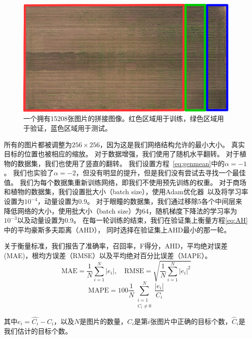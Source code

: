 \documentclass[10pt,twocolumn,letterpaper,UTF8]{article}
\begin{document}
\begin{figure}[t]
\begin{center}
   \includegraphics[width=0.7\linewidth]{fig/field/split.png}
\end{center}
   \caption{
            一个拥有15208张图片的拼接图像。红色区域用于训练，绿色区域用于验证，蓝色区域用于测试。}
\label{fig:ortho}
\end{figure}

所有的图片都被调整为$256 \times 256$，因为这是我们网络结构允许的最小大小。
真实目标的位置也被相应的缩放。
对于数据增强，我们使用了随机水平翻转。
对于植物的数据集，我们也使用了竖直的翻转。
我们设置方程~\eqref{eq:genmean}中的$\alpha=-1$。
我们也实验了$\alpha=-2$，但没有明显的提升，但是我们没有尝试去寻找一个最佳值。
我们为每个数据集重新训练网络，即我们不使用预先训练的权重。
对于商场和植物的数据集，我们设置批大小（batch size），使用Adam优化器~\cite{kingma_2014,amsgrad}以及将学习率设置为$10^{-4}$，动量设置为0.9。
对于眼瞳的数据集，我们通过移除5各个中间层来降低网络的大小，使用批大小（batch size）为64，随机梯度下降法的学习率为$10^{-3}$以及动量设置为0.9。
在每一轮训练的结束，我们在验证集上衡量方程\eqref{eq:AH}中的平均豪斯多夫距离（AHD），
同时选择在验证集上AHD最小的那一轮。

关于衡量标准，我们报告了准确率，召回率，F得分，AHD，平均绝对误差(MAE)，根均方误差（RMSE）以及平均绝对百分比误差（MAPE）。
\begin{equation}
    \text{MAE} = \frac{1}{N}\sum_{i=1}^{N}| e_i |,  \quad \text{RMSE} = \sqrt{\frac{1}{N}\sum_{i=1}^{N} \big| e_i \big|^2}
  \label{eq:MAEandRMSE}
\end{equation}
\begin{equation}
    \text{MAPE} = 100 \frac{1}{N} \sum_{\substack{i=1 \\ C_i \neq 0}}^{N}\frac{\big| e_i \big|}{C_i}
  \label{eq:MAPE}
\end{equation}

其中$e_i = \hat{C_i} - C_i$，以及$N$是图片的数量，$C_i$是第$i$张图片中正确的目标个数，$\hat{C}_i$是我们估计的目标个数。
\end{document}
